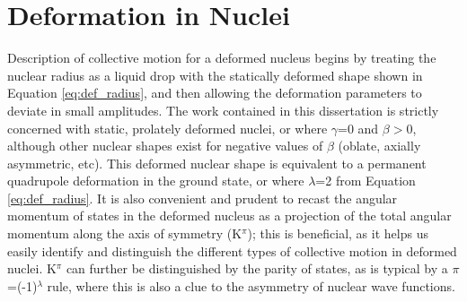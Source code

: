 \section{Deformation in Nuclei}\label{sec:nuclear_deformation}


Description of collective motion for a deformed nucleus begins by treating the nuclear radius as a liquid drop with the statically deformed shape shown in Equation \ref{eq:def_radius}, and then allowing the deformation parameters to deviate in small amplitudes. The work contained in this dissertation is strictly concerned with static, prolately deformed nuclei, or where $\gamma$=0 and $\beta>$0, although other nuclear shapes exist for negative values of $\beta$ (oblate, axially asymmetric, etc). This deformed nuclear shape is equivalent to a permanent quadrupole deformation in the ground state, or where $\lambda$=2 from Equation \ref{eq:def_radius}. It is also convenient and prudent to recast the angular momentum of states in the deformed nucleus as a projection of the total angular momentum along the axis of symmetry (K$^\pi$); this is beneficial, as it helps us easily identify and distinguish the different types of collective motion in deformed nuclei. K$^\pi$ can further be distinguished by the parity of states, as is typical by a $\pi$=(-1)$^\lambda$ rule, where this is also a clue to the asymmetry of nuclear wave functions.


